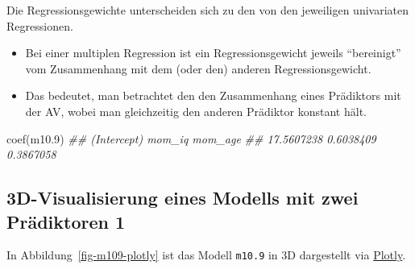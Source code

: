 \documentclass[
  a4paper,
  DIV=11]{scrreprt}
\newenvironment{Shaded}{\begin{snugshade}}{\end{snugshade}}
\newcommand{\DocumentationTok}[1]{\textcolor[rgb]{0.37,0.37,0.37}{\textit{#1}}}
\newcommand{\FloatTok}[1]{\textcolor[rgb]{0.68,0.00,0.00}{#1}}
\newcommand{\FunctionTok}[1]{\textcolor[rgb]{0.28,0.35,0.67}{#1}}
\newcommand{\NormalTok}[1]{\textcolor[rgb]{0.00,0.23,0.31}{#1}}
\providecommand{\tightlist}{%
  \setlength{\itemsep}{0pt}\setlength{\parskip}{0pt}}\usepackage{longtable,booktabs,array}
\theoremstyle{definition}
\theoremstyle{remark}
\begin{document}
\begin{tcolorbox}[enhanced jigsaw, left=2mm, colframe=quarto-callout-important-color-frame, opacityback=0, arc=.35mm, rightrule=.15mm, breakable, toptitle=1mm, colbacktitle=quarto-callout-important-color!10!white, colback=white, coltitle=black, bottomrule=.15mm, titlerule=0mm, opacitybacktitle=0.6, bottomtitle=1mm, title=\textcolor{quarto-callout-important-color}{\faExclamation}\hspace{0.5em}{Wichtig}, toprule=.15mm, leftrule=.75mm]
Die Regressionsgewichte unterscheiden sich zu den von den jeweiligen
univariaten Regressionen.
\end{tcolorbox}

\begin{itemize}
\tightlist
\item
  Bei einer multiplen Regression ist ein Regressionsgewicht jeweils
  ``bereinigt'' vom Zusammenhang mit dem (oder den) anderen
  Regressionsgewicht.
\item
  Das bedeutet, man betrachtet den den Zusammenhang eines Prädiktors mit
  der AV, wobei man gleichzeitig den anderen Prädiktor konstant hält.
\end{itemize}

\begin{Shaded}
\begin{Highlighting}[]
\FunctionTok{coef}\NormalTok{(m10}\FloatTok{.9}\NormalTok{)}
\DocumentationTok{\#\# (Intercept)      mom\_iq     mom\_age }
\DocumentationTok{\#\#  17.5607238   0.6038409   0.3867058}
\end{Highlighting}
\end{Shaded}

\hypertarget{d-visualisierung-eines-modells-mit-zwei-pruxe4diktoren-1}{%
\subsection{3D-Visualisierung eines Modells mit zwei Prädiktoren
1}\label{d-visualisierung-eines-modells-mit-zwei-pruxe4diktoren-1}}

In Abbildung~\ref{fig-m109-plotly} ist das Modell \texttt{m10.9} in 3D
dargestellt via \href{https://plotly.com/r/}{Plotly}.
\end{document}
